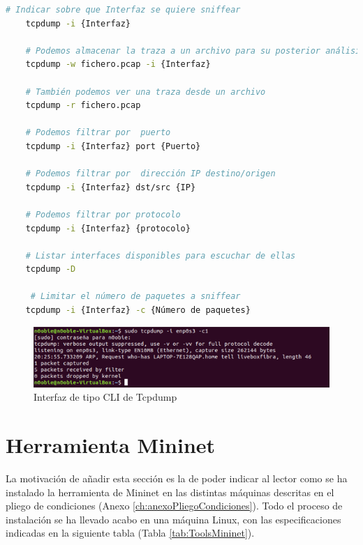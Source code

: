 \begin{lstlisting}[language= bash, style=Consola2, caption={Comandos útiles con Tcpdump},label=code:tcpdump_use]
    # Indicar sobre que Interfaz se quiere sniffear
    tcpdump -i {Interfaz}
    
    # Podemos almacenar la traza a un archivo para su posterior análisis
    tcpdump -w fichero.pcap -i {Interfaz}
    
    # También podemos ver una traza desde un archivo
    tcpdump -r fichero.pcap
    
    # Podemos filtrar por  puerto
    tcpdump -i {Interfaz} port {Puerto}
    
    # Podemos filtrar por  dirección IP destino/origen
    tcpdump -i {Interfaz} dst/src {IP}
    
    # Podemos filtrar por protocolo
    tcpdump -i {Interfaz} {protocolo}
    
    # Listar interfaces disponibles para escuchar de ellas 
    tcpdump -D
    
     # Limitar el número de paquetes a sniffear
    tcpdump -i {Interfaz} -c {Número de paquetes}
\end{lstlisting}
\vspace{1cm}
\begin{figure}[ht]
    \centering
    \includegraphics[width=\textwidth]{archivos/img/anexos/tcpdump_cli_edited.png}
    \caption{Interfaz de tipo CLI de Tcpdump}
    \label{tcpdumpCli}
\end{figure}

\newpage
\section{Herramienta Mininet}
\label{sec:ToolsMininet}
La motivación de añadir esta sección es la de poder indicar al lector como se ha instalado la herramienta de Mininet en las distintas máquinas descritas en el pliego de condiciones (Anexo \ref{ch:anexoPliegoCondiciones}). Todo el proceso de instalación se ha llevado acabo en una máquina Linux, con las especificaciones indicadas en la siguiente tabla (Tabla \ref{tab:ToolsMininet}).

